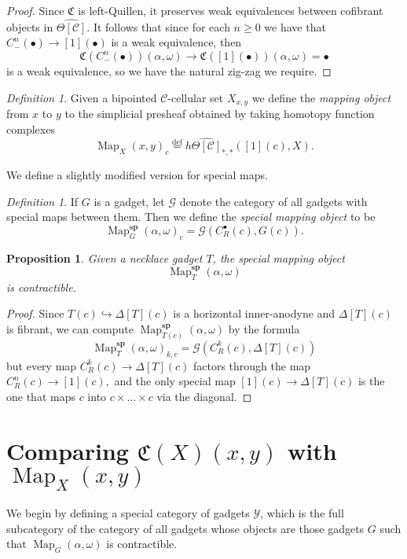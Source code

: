\documentclass{amsart}
\numberwithin{equation}{section}
\theoremstyle{plain}   %
\newtheorem{prop}[subsection]{Proposition}
\theoremstyle{remark}
\newtheorem{defn}[subsection]{Definition}
\theoremstyle{plain}
\DeclareMathOperator{\Map}{Map}
\newcommand{\C}{\ensuremath{\mathcal{C}}}
\newcommand{\defeq}{\overset{\mathrm{def}}=}
\newcommand{\cellset}{\ensuremath{\widehat{\Theta[\mathcal{C}]}}}
\begin{document}
\begin{proof}
	Since \(\mathfrak{C}\) is left-Quillen, it preserves weak equivalences between cofibrant objects in \(\cellset\).  It follows that since for each \(n\geq 0\) we have that \(C^n_{-}(\bullet)\to [1](\bullet)\) is a weak equivalence, then
	\[\mathfrak{C}(C^n_{-}(\bullet))(\alpha,\omega) \to \mathfrak{C}([1](\bullet))(\alpha,\omega)=\bullet\]
	is a weak equivalence, so we have the natural zig-zag we require.
\end{proof}
\begin{defn}
	Given a bipointed \(\C\)-cellular set \(X_{x,y}\) we define the \emph{mapping object} from \(x\) to \(y\) to the simplicial presheaf obtained by taking homotopy function complexes
	\[\Map_X(x,y)_c\defeq h\cellset_{\ast,\ast}([1](c), X).\]
\end{defn}

We define a slightly modified version for special maps.

\begin{defn}
	If \(G\) is a gadget, let \(\mathcal{G}\) denote the category of all gadgets with special maps between them.  Then we define the \emph{special mapping object} to be \[\Map^\mathbf{sp}_G(\alpha,\omega)_c=\mathcal{G}(C^\bullet_R(c),G(c)).\]
\end{defn}

\begin{prop}\label{goodgadgets}
	Given a necklace gadget \(T\), the special mapping object \[\Map^\mathbf{sp}_T(\alpha,\omega)\] is contractible.
\end{prop}
\begin{proof}
	Since \(T(c)\hookrightarrow \Delta[T](c)\) is a horizontal inner-anodyne and \(\Delta[T](c)\) is fibrant, we can compute \(\Map^\mathbf{sp}_{T(c)}(\alpha,\omega)\) by the formula 
	\[\Map^\mathbf{sp}_T(\alpha,\omega)_{k,c} = \mathcal{G}(C_R^k(c),\Delta[T](c))\]
	but every map \(C^k_R(c)\to \Delta[T](c)\) factors through the map \(C^n_R(c)\to [1](c),\) and the only special map \([1](c)\to \Delta[T](c)\) is the one that maps \(c\) into \(c\times \dots \times c\) via the diagonal.
\end{proof}

\section{Comparing \(\mathfrak{C}(X)(x,y)\) with \(\Map_X(x,y)\)}

We begin by defining a special category of gadgets \(\mathcal{Y}\), which is the full subcategory of the category of all gadgets whose objects are those gadgets \(G\) such that \(\Map_G(\alpha,\omega)\) is contractible.
\end{document}

